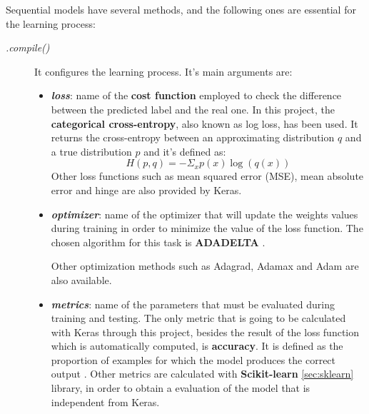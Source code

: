 Sequential models have several methods, and the following ones are essential for the learning process:
\begin{description}
	\item[\textit{.compile()}] It configures the learning process. It's main arguments are:
	\begin{itemize}
		\item \textbf{\textit{loss}}: name of the \textbf{cost function} employed to check the difference between the predicted label and the real one. In this project, the \textbf{categorical cross-entropy}, also known as log loss, has been used. It returns the cross-entropy between an approximating distribution $q$ and a true distribution $p$ \cite{2016arXiv160502688short} and it's defined as:
		\begin{equation}\label{eq:categorical_crossentropy}
		H(p,q)=-\Sigma_{x}p(x)\log(q(x))
		\end{equation}		
		Other loss functions such as mean squared error (MSE), mean absolute error and hinge are also provided by Keras.
		
		\item \textbf{\textit{optimizer}}: name of the optimizer that will update the weights values during training in order to minimize the value of the loss function. The chosen algorithm for this task is \textbf{ADADELTA} \cite{DBLP:journals/corr/abs-1212-5701}.
		
		Other optimization methods such as Adagrad, Adamax and Adam are also available.
		
		\item \textbf{\textit{metrics}}: name of the parameters that must be evaluated during training and testing. The only metric that is going to be calculated with Keras through this project, besides the result of the loss function which is automatically computed, is \textbf{accuracy}. It is defined as the proportion of examples for which the model produces the correct output \cite{Goodfellow-et-al-2016}.			
		Other metrics are calculated with \textbf{Scikit-learn} \ref{sec:sklearn} library, in order to obtain a evaluation of the model that is independent from Keras.
	\end{itemize}
\end{description}

